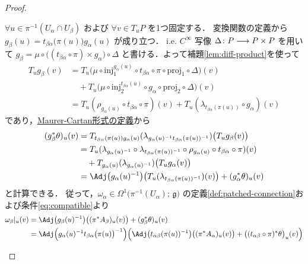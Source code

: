 \documentclass[geometry_main]{subfiles}
\begin{document}
\begin{proof}
\begin{enumerate}
\begin{description}
            $\forall u \in \pi^{-1}(U_\alpha \cap U_\beta)$ および $\forall v \in T_u P$ を1つ固定する．
            変換関数の定義から $g_\beta(u) = t_{\beta\alpha} \bigl( \pi(u) \bigr) g_\alpha(u)$ が成り立つ．
            i.e. $C^\infty$ 写像 $\Delta \colon P \longrightarrow P \times P$ を用いて $g_\beta = \mu \circ \bigl( (t_{\beta\alpha} \circ \pi) \times g_\alpha \bigr) \circ \Delta$ と書ける．よって補題\ref{lem:diff-product}を使って
            \begin{align}
                T_u g_\beta (v) 
                &= T_u \bigl( \mu \circ \mathrm{inj}_1^{g_\alpha(u)} \circ t_{\beta\alpha} \circ \pi \circ \mathrm{proj}_1 \circ \Delta \bigr) (v) \\
                &\quad + T_u \bigl( \mu \circ \mathrm{inj}_2^{t_{\beta\alpha}(u)} \circ g_\alpha \circ \mathrm{proj}_2 \circ \Delta \bigr) (v) \\
                &= T_u (\rho_{g_\alpha(u)} \circ t_{\beta\alpha} \circ \pi)(v) + T_u(\lambda_{t_{\beta\alpha}(\pi(u))} \circ g_\alpha)(v)
            \end{align}
            であり，\hyperref[def:Maurer-Cartan]{Maurer-Cartan形式の定義}から
            \begin{align}
                (g_\beta^* \theta)_u(v)
                &= T_{t_{\beta\alpha}(\pi(u)) g_\alpha(u)} (\lambda_{g_\alpha(u)^{-1} t_{\beta\alpha}(\pi(u))^{-1}}) \bigl( T_u g_\beta(v) \bigr)  \\
                &= T_u (\lambda_{g_\alpha(u)^{-1}} \circ \lambda_{t_{\beta\alpha}(\pi(u))^{-1}} \circ \rho_{g_\alpha(u)} \circ t_{\beta\alpha} \circ \pi)(v) \\
                &\quad + T_{g_\alpha(u)} (\lambda_{g_\alpha(u)^{-1}}) \bigl( T_u g_\alpha (v) \bigr) \\
                &= \Adj \bigl(g_\alpha(u)^{-1}\bigr) \bigl( T_u(\lambda_{t_{\beta\alpha}(\pi(u))^{-1}})(v) \bigr) + (g_\alpha^* \theta)_u (v)
            \end{align}
            と計算できる．
            従って，$\omega_\alpha \in \Omega^1\bigl(\pi^{-1}(U_\alpha);\, \mathfrak{g}\bigr)$ の定義\eqref{def:patched-connection}および条件\eqref{eq:compatible}より
            \begin{align}
                \omega_\beta|_u (v)
                &= \Adj \bigl( g_\beta(u)^{-1} \bigr) \bigl( (\pi^* A_\beta)_u(v) \bigr) + (g_\beta^* \theta)_u(v) \\
                &= \Adj \Bigl( g_\alpha(u)^{-1} t_{\beta\alpha}\bigl(\pi(u)\bigr)^{-1} \Bigr) \Bigl( \Adj \bigl( t_{\alpha\beta}(\pi(u))^{-1} \bigr) \bigl( (\pi^* A_\alpha)_u(v) \bigr) + \bigl((t_{\alpha\beta} \circ \pi)^* \theta\bigr)_u(v)  \Bigr) \\

\end{align}
\end{description}
\end{enumerate}
\end{proof}
\end{document}
